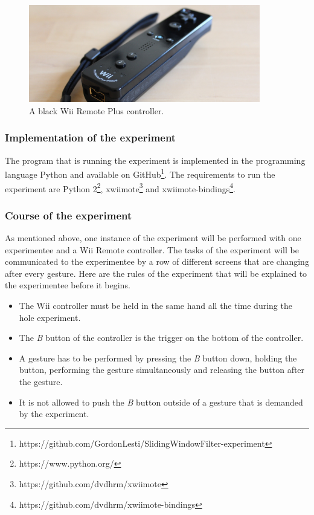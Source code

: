 \documentclass[runningheads,a4paper]{llncs}
\begin{document}
    \begin{figure}
        \centering
        \includegraphics[width=0.9\textwidth]{wii-remote-plus.jpg}
        \caption{A black Wii Remote Plus controller.}
        \label{fig:wii-remote}
    \end{figure}

    \subsubsection{Implementation of the experiment}
    The program that is running the experiment is implemented in the programming language Python and available on
    GitHub\footnote{https://github.com/GordonLesti/SlidingWindowFilter-experiment}. The requirements to run the
    experiment are Python 2\footnote{https://www.python.org/}, xwiimote\footnote{https://github.com/dvdhrm/xwiimote} and
    xwiimote-bindings\footnote{https://github.com/dvdhrm/xwiimote-bindings}.

    \subsubsection{Course of the experiment}
    As mentioned above, one instance of the experiment will be performed with one experimentee and a Wii Remote
    controller. The tasks of the experiment will be communicated to the experimentee by a row of different screens that
    are changing after every gesture. Here are the rules of the experiment that will be explained to the experimentee
    before it begins.
    \begin{itemize}
        \item The Wii controller must be held in the same hand all the time during the hole experiment.
        \item The \textit{B} button of the controller is the trigger on the bottom of the controller.
        \item A gesture has to be performed by pressing the \textit{B} button down, holding the button, performing the
        gesture simultaneously and releasing the button after the gesture.
        \item It is not allowed to push the \textit{B} button outside of a gesture that is demanded by the experiment.
    \end{itemize}
\end{document}
